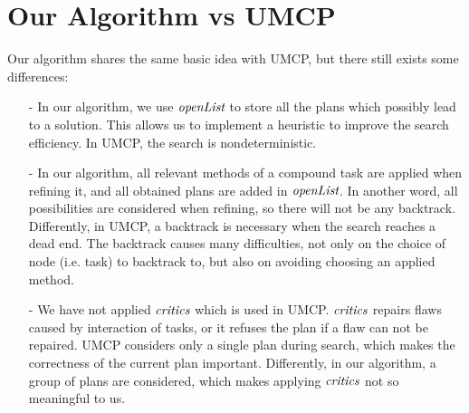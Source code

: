 \section{Our Algorithm vs UMCP}
Our algorithm shares the same basic idea with UMCP, but there still exists some differences:

\begin{itemize}
\item[-] In our algorithm, we use $\emph{openList}$ to store all the plans which possibly lead to a solution. This allows us to implement a heuristic to improve the search efficiency. In UMCP, the search is nondeterministic.
\item[-] In our algorithm, all relevant methods of a compound task are applied when refining it, and all obtained plans are added in $\emph{openList}$. In another word, all possibilities are considered when refining, so there will not be any backtrack. Differently, in UMCP, a backtrack is necessary when the search reaches a dead end. The backtrack causes many difficulties, not only on the choice of node (i.e. task) to backtrack to, but also on avoiding choosing an applied method.
\item[-] We have not applied $\emph{critics}$ which is used in UMCP. $\emph{critics}$ repairs flaws caused by interaction of tasks, or it refuses the plan if a flaw can not be repaired. UMCP considers only a single plan during search, which makes the correctness of the current plan important. Differently, in our algorithm, a group of plans are considered, which makes applying $\emph{critics}$ not so meaningful to us.
\end{itemize}
